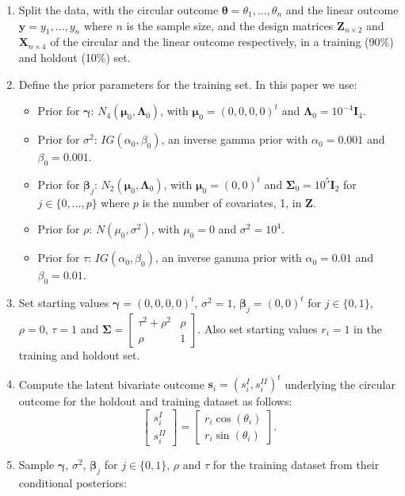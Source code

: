\documentclass[12pt,]{article}
\begin{document}
\begin{enumerate}
\item Split the data, with the circular outcome $\boldsymbol{\theta} = \theta_1, \dots, \theta_n$ and the linear outcome $\boldsymbol{y} = y_1, \dots, y_n$ where $n$ is the sample size, and the design matrices $\boldsymbol{Z}_{n \times 2}$  and $\boldsymbol{X}_{n \times 4}$ of the circular and the linear outcome respectively, in a training (90\%) and holdout (10\%) set. 
\item Define the prior parameters for the training set. In this paper we use:

\begin{itemize}
\item Prior for $\boldsymbol{\gamma}$: $N_4(\boldsymbol{\mu}_{0}, \boldsymbol{\Lambda}_{0})$, with $\boldsymbol{\mu}_{0} = (0,0,0,0)^t$ and $\boldsymbol{\Lambda}_{0} = 10^{-4}\boldsymbol{I}_4$.
\item Prior for $\sigma^2$: $IG(\alpha_{0}, \beta_{0})$, an inverse gamma prior with $\alpha_{0} = 0.001$ and $\beta_{0} = 0.001$.
\item Prior for $\boldsymbol{\beta}_{j}$: $N_2(\boldsymbol{\mu}_{0}, \boldsymbol{\Lambda}_0)$, with $\boldsymbol{\mu}_{0} = (0,0)^t$ and  $\boldsymbol{\Sigma}_{0} = 10^{5}\boldsymbol{I}_2$ for $j \in \{0, \dots, p\}$ where $p$ is the number of covariates, 1, in $\boldsymbol{Z}$.
\item Prior for $\rho$: $N(\mu_0, \sigma^2)$, with $\mu_0 = 0$ and $\sigma^2 = 10^{4}$.
\item Prior for $\tau$: $IG(\alpha_{0}, \beta_{0})$, an inverse gamma prior with $\alpha_{0} = 0.01$ and $\beta_{0} = 0.01$.
\end{itemize}

\item Set starting values $\boldsymbol{\gamma} = (0,0,0,0)^t$, $\sigma^2 = 1$, $\boldsymbol{\beta}_j = (0,0)^t$ for $j \in \{0,1\}$, $\rho = 0$, $\tau = 1$ and $\boldsymbol{\Sigma} = \begin{bmatrix} \tau^2 + \rho^2 & \rho\\ \rho & 1 \end{bmatrix}$. Also set starting values $r_i = 1$ in the training and holdout set. 
\item Compute the latent bivariate outcome $\boldsymbol{s}_i = (s_i^{I}, s_i^{II})^t$ underlying the circular outcome for the holdout and training dataset as follows:
$$\begin{bmatrix} s^{I}_{i} \\ s^{II}_{i} \end{bmatrix} = \begin{bmatrix} r_i \cos (\theta_i) \\  r_i\sin (\theta_i)\end{bmatrix}.$$
\item Sample $\boldsymbol{\gamma}$, $\sigma^2$, $\boldsymbol{\beta}_j$ for $j \in \{0,1\}$, $\rho$ and $\tau$ for the training dataset from their conditional posteriors:


\end{enumerate}
\end{document}
